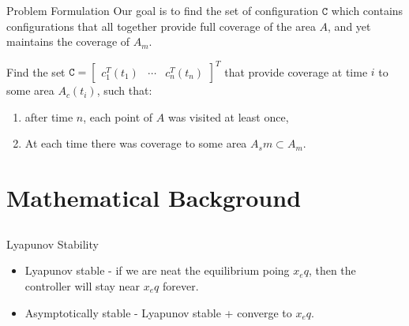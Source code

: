 \documentclass[t]{beamer}
\newcommand{\bmat}[1]{\begin{bmatrix}#1\end{bmatrix}}
\begin{document}
\begin{frame}[label=formulation3]{Problem Formulation}
Our goal is to find the set of configuration $\texttt{C}$ which contains configurations that all together provide full coverage of the area $A$, and yet maintains the coverage of $A_m$.

\begin{problem} \label{GeneralProblem}
Find the set $\texttt{C} = \bmat{
c_{1}^{T}\left(t_1\right)&\cdots&c_{n}^{T}\left(t_n\right)}^{T}$ that provide coverage at time $i$ to some area $A_c \left( t_i \right)$, such that:
\begin{enumerate}
\item after time $n$, each point of $A$ was visited at least once,
\item At each time there was coverage to some area $A_sm \subset A_m$.
\end{enumerate}
\end{problem}
\end{frame}


\section[Mathematical Background]{Mathematical Background}
\subsection[Lyaponov Stability]{}
\begin{frame}[label=lyapunovstability1]{Lyapunov Stability}
\begin{itemize}
\item<1-> Lyapunov stable - if we are neat the equilibrium poing $x_eq$, then the controller will stay near $x_eq$ forever.
\item<2-> Asymptotically stable - Lyapunov stable + converge to $x_eq$.
\end{itemize}
\end{frame}
\end{document}
